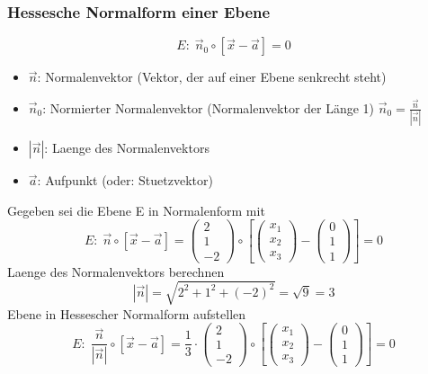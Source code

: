 \begin{multicols*}{2}
    \subsubsection{Hessesche Normalform einer Ebene}
    \[E\colon\; \vec{n}_0 \circ [\vec{x} - \vec{a}] = 0\]
    \begin{itemize}
        \item  $\vec{n}$: Normalenvektor (Vektor, der auf einer Ebene senkrecht steht)
        \item  $\vec{n}_0$: Normierter Normalenvektor (Normalenvektor der Länge 1) $\vec{n}_0 = \frac{\vec{n}}{|\vec{n}|}$
        \item  $|\vec{n}|$: Laenge des Normalenvektors
        \item  $\vec{a}$: Aufpunkt (oder: Stuetzvektor)
    \end{itemize}
    Gegeben sei die Ebene E in Normalenform mit
    \[E\colon\; \vec{n} \circ \left[\vec{x} - \vec{a}\right] = \begin{pmatrix} 2 \\ 1 \\ -2 \end{pmatrix} \circ \left[\begin{pmatrix} x_1 \\ x_2 \\ x_3 \end{pmatrix} - \begin{pmatrix} 0 \\ 1 \\ 1 \end{pmatrix}\right] = 0\]
    Laenge des Normalenvektors berechnen
    \[|\vec{n}| = \sqrt{2^2 + 1^2 + (-2)^2} = \sqrt{9} = 3\]
    Ebene in Hessescher Normalform aufstellen
    \[E\colon\; \frac{\vec{n}}{|\vec{n}|} \circ \left[\vec{x} - \vec{a}\right] = \frac{1}{3} \cdot \begin{pmatrix} 2 \\ 1 \\ -2 \end{pmatrix} \circ \left[\begin{pmatrix} x_1 \\ x_2 \\ x_3 \end{pmatrix} - \begin{pmatrix} 0 \\ 1 \\ 1 \end{pmatrix}\right] = 0\]

\end{multicols*}

\newpage{}
